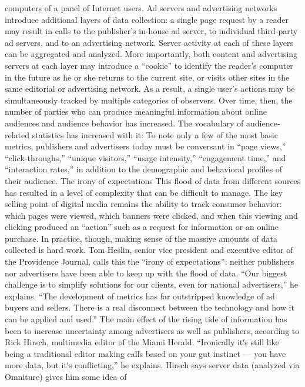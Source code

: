 computers of a panel of Internet users.
Ad servers and advertising networks introduce additional layers of data
collection: a single page request by a reader may result in calls to the
publisher’s in‐house ad server, to individual third‐party ad servers, and to
an advertising network. Server activity at each of these layers can be
aggregated and analyzed. More importantly, both content and advertising
servers at each layer may introduce a ``cookie'' to identify the reader’s
computer in the future as he or she returns to the current site, or visits
other sites in the same editorial or advertising network. As a result, a
single user’s actions may be simultaneously tracked by multiple categories
of observers.
Over time, then, the number of parties who can produce meaningful
information about online audiences and audience behavior has increased.
The vocabulary of audience‐related statistics has increased with it: To note
only a few of the most basic metrics, publishers and advertisers today
must be conversant in ``page views,'' ``click‐throughs,'' ``unique visitors,''
``usage intensity,'' ``engagement time,'' and ``interaction rates,'' in addition
to the demographic and behavioral profiles of their audience.
The irony of expectations
This flood of data from different sources has resulted in a level of
complexity that can be difficult to manage. The key selling point of digital
media remains the ability to track consumer behavior: which pages were
viewed, which banners were clicked, and when this viewing and clicking
produced an ``action'' such as a request for information or an online
purchase. In practice, though, making sense of the massive amounts of
data collected is hard work.
Tom Heslin, senior vice president and executive editor of the Providence
Journal, calls this the ``irony of expectations'': neither publishers nor
advertisers have been able to keep up with the flood of data. ``Our biggest
challenge is to simplify solutions for our clients, even for national
advertisers,'' he explains. ``The development of metrics has far outstripped
knowledge of ad buyers and sellers. There is a real disconnect between the
technology and how it can be applied and used.''
The main effect of the rising tide of information has been to increase
uncertainty among advertisers as well as publishers, according to Rick
Hirsch, multimedia editor of the Miami Herald. ``Ironically itʹs still like
being a traditional editor making calls based on your gut instinct — you
have more data, but itʹs conflicting,'' he explains.
Hirsch says server data (analyzed via Omniture) gives him some idea of
